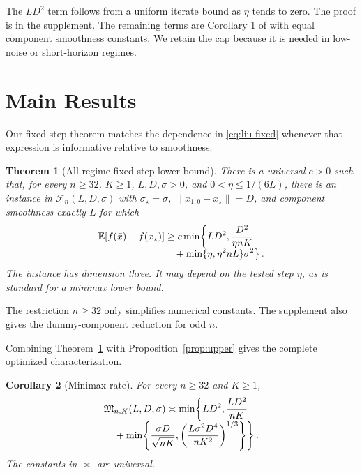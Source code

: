 \documentclass[twoside]{article}
\newtheorem{theorem}{Theorem}
\newtheorem{corollary}[theorem]{Corollary}
\newcommand{\E}{\mathbb E}
\newcommand{\cF}{\mathcal F}
\begin{document}
The $LD^2$ term follows from a uniform iterate bound as $\eta$ tends to zero. The proof is in the supplement. The remaining terms are Corollary 1 of \citet{liu2026dominates} with equal component smoothness constants. We retain the cap because it is needed in low-noise or short-horizon regimes.

\section{Main Results}
\label{sec:results}

Our fixed-step theorem matches the dependence in \eqref{eq:liu-fixed} whenever that expression is informative relative to smoothness.

\begin{theorem}[All-regime fixed-step lower bound]
\label{thm:fixed}
There is a universal $c>0$ such that, for every $n\ge32$, $K\ge1$, $L,D,\sigma>0$, and $0<\eta\le1/(6L)$, there is an instance in $\cF_n(L,D,\sigma)$ with $\sigma_\star=\sigma$, $\lVert x_{1,0}-x_\star\rVert=D$, and component smoothness exactly $L$ for which
\begin{align}
 \E[f(\bar x)-f(x_\star)]
 \ge c\min\!\left\{LD^2,\frac{D^2}{\eta nK}\right.\quad\notag\\[-1ex]
 \left.{}+\min\{\eta,\eta^2nL\}\sigma^2\right\}.
 \label{eq:fixed-lower}
\end{align}
The instance has dimension three. It may depend on the tested step $\eta$, as is standard for a minimax lower bound.
\end{theorem}

The restriction $n\ge32$ only simplifies numerical constants. The supplement also gives the dummy-component reduction for odd $n$.

Combining Theorem~\ref{thm:fixed} with Proposition~\ref{prop:upper} gives the complete optimized characterization.

\begin{corollary}[Minimax rate]
\label{cor:minimax}
For every $n\ge32$ and $K\ge1$,
\begin{align}
 \mathfrak M_{n,K}(L,D,\sigma)
 \asymp
 \min\!\left\{LD^2,\frac{LD^2}{nK}\right.\quad\notag\\[-1ex]
 \left.{}+\min\!\left\{
 \frac{\sigma D}{\sqrt{nK}},
 \left(\frac{L\sigma^2D^4}{nK^2}\right)^{1/3}
 \right\}\right\}.
 \label{eq:minimax-rate}
\end{align}
The constants in $\asymp$ are universal.
\end{corollary}
\end{document}
